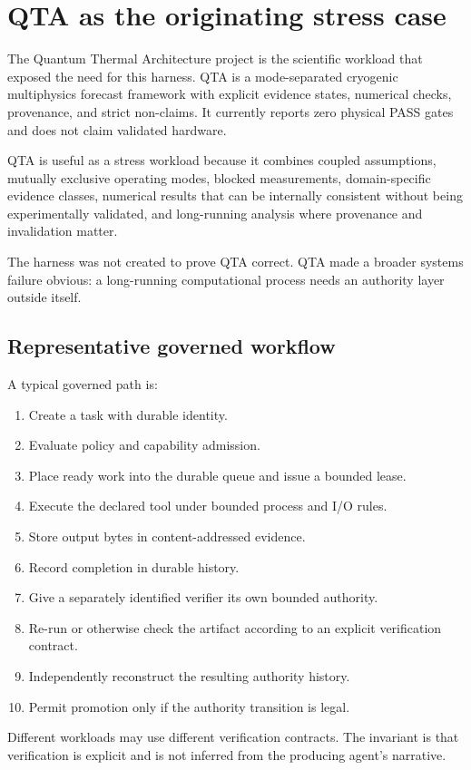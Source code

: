 \section{QTA as the originating stress case}

The Quantum Thermal Architecture project is the scientific workload that exposed the need for this harness. QTA is a mode-separated cryogenic multiphysics forecast framework with explicit evidence states, numerical checks, provenance, and strict non-claims. It currently reports zero physical PASS gates and does not claim validated hardware.

QTA is useful as a stress workload because it combines coupled assumptions, mutually exclusive operating modes, blocked measurements, domain-specific evidence classes, numerical results that can be internally consistent without being experimentally validated, and long-running analysis where provenance and invalidation matter.

The harness was not created to prove QTA correct. QTA made a broader systems failure obvious: a long-running computational process needs an authority layer outside itself.


\subsection{Representative governed workflow}
A typical governed path is:

\begin{enumerate}
  \item Create a task with durable identity.
  \item Evaluate policy and capability admission.
  \item Place ready work into the durable queue and issue a bounded lease.
  \item Execute the declared tool under bounded process and I/O rules.
  \item Store output bytes in content-addressed evidence.
  \item Record completion in durable history.
  \item Give a separately identified verifier its own bounded authority.
  \item Re-run or otherwise check the artifact according to an explicit verification contract.
  \item Independently reconstruct the resulting authority history.
  \item Permit promotion only if the authority transition is legal.
\end{enumerate}

Different workloads may use different verification contracts. The invariant is that verification is explicit and is not inferred from the producing agent's narrative.

